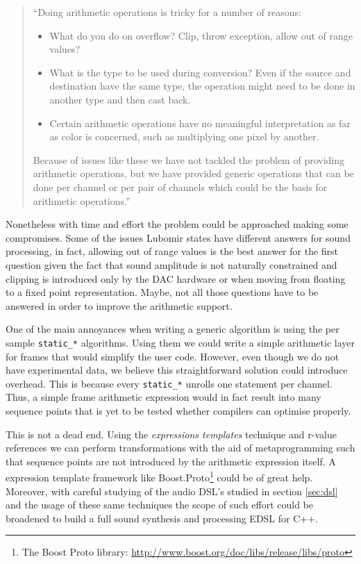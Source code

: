 \begin{quotation}
``Doing arithmetic operations is tricky for a number of reasons:

\begin{itemize}
\item What do you do on overflow? Clip, throw exception, allow out of
  range values?

\item What is the type to be used during conversion? Even if the
  source and destination have the same type, the operation might need
  to be done in another type and then cast back.

\item Certain arithmetic operations have no meaningful interpretation
  as far as color is concerned, such as multiplying one pixel by
  another. 
\end{itemize}

Because of issues like these we have not tackled the problem of
providing arithmetic operations, but we have provided generic
operations that can be done per channel or per pair of channels which
could be the basis for arithmetic operations.''
\end{quotation}

Nonetheless with time and effort the problem could be
approached making some compromises. Some of the issues Lubomir states
have different answers for sound processing, in fact, allowing out of
range values is the best answer for the first question given the fact
that sound amplitude is not naturally constrained and clipping is
introduced only by the DAC hardware or when moving from floating to a
fixed point representation. Maybe, not all those questions have to be
answered in order to improve the arithmetic support.

One of the main annoyances when writing a generic algorithm is using
the per sample \texttt{static\_*} algorithms. Using them we could
write a simple arithmetic layer for frames that would simplify the
user code. However, even though we do not have experimental data, we
believe this straightforward solution could introduce overhead. This
is because every \texttt{static\_*} unrolls one statement per
channel. Thus, a simple frame arithmetic expression would in fact
result into many sequence points that is yet to be tested whether
compilers can optimise properly.

This is not a dead end. Using the \emph{expressions templates}
\cite{veldhuizen95expression} technique and r-value references we can
perform transformations with the aid of metaprogramming such that
sequence points are not introduced by the arithmetic expression
itself. A expression template framework like Boost.Proto\footnote{The
  Boost Proto library:
  \url{http://www.boost.org/doc/libs/release/libs/proto}}
\cite{niebler07proto} could be of great help. Moreover, with careful
studying of the audio DSL's studied in section \ref{sec:dsl} and the
usage of these same techniques the scope of such effort could be
broadened to build a full sound synthesis and processing EDSL for C++.

